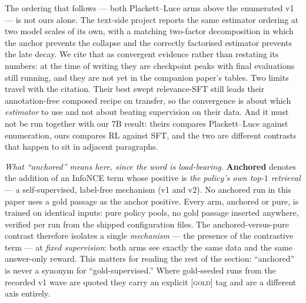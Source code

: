 The ordering that follows --- both Plackett--Luce arms above the enumerated v1 --- is not ours
alone. The text-side project reports the same estimator ordering at two model scales of its own,
with a matching two-factor decomposition in which the anchor prevents the collapse and the
correctly factorised estimator prevents the late decay. We cite that as convergent evidence
rather than restating its numbers: at the time of writing they are checkpoint peaks with final
evaluations still running, and they are not yet in the companion paper's tables. Two limits
travel with the citation. Their best swept relevance-SFT still leads their annotation-free
composed recipe on transfer, so the convergence is about which \emph{estimator} to use and not
about beating supervision on their data. And it must not be run together with our $7$B result:
theirs compares Plackett--Luce against enumeration, ours compares RL against SFT, and the two
are different contrasts that happen to sit in adjacent paragraphs.

\emph{What ``anchored'' means here, since the word is load-bearing.} \textbf{Anchored} denotes
the addition of an InfoNCE term whose positive is \emph{the policy's own top-$1$ retrieval} --- a
self-supervised, label-free mechanism (v1 and v2). No anchored run in this paper uses a gold
passage as the anchor positive. Every arm, anchored or pure, is trained on identical inputs:
pure policy pools, no gold passage inserted anywhere, verified per run from the shipped
configuration files. The anchored-versus-pure contrast therefore isolates a single
\emph{mechanism} --- the presence of the contrastive term --- at \emph{fixed supervision}: both
arms see exactly the same data and the same answer-only reward. This matters for reading the rest
of the section: ``anchored'' is never a synonym for ``gold-supervised.'' Where gold-seeded runs
from the recorded v1 wave are quoted they carry an explicit \textsc{[gold]} tag and are a
different axis entirely.

